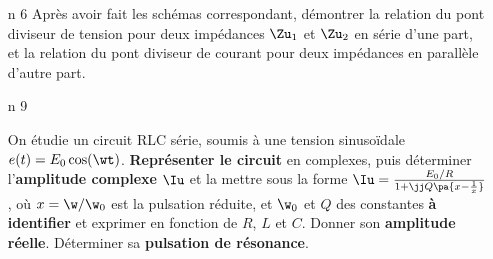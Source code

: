 \documentclass[a4paper, 10pt, final, garamond]{book}
\begin{document}
\begin{enumerate}[label=\sqenumi]
	\item[n]{6}%
	      Après avoir fait les schémas correspondant, démontrer la relation du
	      pont diviseur de tension pour deux impédances $\Zu_1$ et $\Zu_2$ en
	      série d'une part, et la relation du pont diviseur de courant pour deux
	      impédances en parallèle d'autre part.
	      \smallbreak
	      \begin{isd}[]
		      \begin{center}
		      \end{center}
		      \psw{%
			      \[
				      \Iu \stm{=} \frac{\Uu\ind{brch}}{\Zu\ind{brch}} = \frac{\Uu_k}{\Zu_k}
				      \Lra
				      \boxed{
					      \Uu_k \stm{=} \frac{\Zu_k}{\Zu\ind{brch}}\Uu\ind{brch}
				      }%
			      \]
		      }%
		      \tcblower
		      \begin{center}
		      \end{center}
		      \psw{%
			      \[
				      \Uu \stm{=} \Zu\ind{para}\Iu\ind{para} = \Zu_1\Iu_1
				      \Lra
				      \boxed{
					      \Iu_k \stm{=} \frac{\Zu\ind{para}}{\Zu_k}\Iu\ind{para}
				      }%
			      \]
		      }%
	      \end{isd}
	\item[n]{9}%
	      ~
	      \smallbreak
	      \vspace{-25pt}
	      \begin{isd}[righthand ratio=.25, interior hidden, sidebyside align=top]
		      On étudie un circuit RLC série, soumis à une tension sinusoïdale
		      $e(t) = E_0 \cos(\wt)$. \textbf{Représenter le circuit} en complexes,
		      puis déterminer l'\textbf{amplitude complexe} $\Iu$ et la mettre sous
		      la forme $\Iu = \frac{E_0/R}{1+\jj Q \pa{x-\frac{1}{x}}}$, où $x =
			      \w/\w_0$ est la pulsation réduite, et $\w_0$ et $Q$ des constantes
		      \textbf{à identifier} et exprimer en fonction de $R$, $L$ et $C$.
		      Donner son \textbf{amplitude réelle}. Déterminer sa \textbf{pulsation
			      de résonance}.
		      \tcblower
		      \begin{center}
\end{center}
\end{isd}
\end{enumerate}
\end{document}
